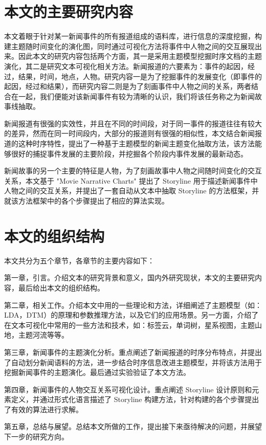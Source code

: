 \section{本文的主要研究内容}
本文着眼于针对某一新闻事件的所有报道组成的语料库，进行信息的深度挖掘，构建主题随时间变化的演化图，同时通过可视化方法将事件中人物之间的交互展现出来。因此本文的研究内容包括两个方面，其一是采用主题模型挖掘时序文档的主题演化，其二是研究文本可视化相关方法。新闻报道的六要素为：事件的起因，经过，结果，时间，地点，人物。研究内容一是为了挖掘事件的发展变化（即事件的起因，经过和结果），而研究内容二则是为了刻画事件中人物之间的关系，两者结合在一起，我们便能对该新闻事件有较为清晰的认识，我们将该任务称之为新闻故事线抽取。

新闻报道有很强的实效性，并且在不同的时间段，对于同一事件的报道往往有较大的差异，然而在同一时间段内，大部分的报道则有很强的相似性，本文结合新闻报道的这种时序特性，提出了一种基于主题模型的新闻主题变化抽取方法，该方法能够很好的捕捉事件发展的主要阶段，并挖掘各个阶段内事件发展的最新动态。

新闻故事的另一个主要的特征是人物，为了刻画故事中人物之间随时间变化的交互关系，本文基于 "Movie Narrative Charts" \cite{xkcd657} 提出了 Storyline 用于描述新闻事件中人物之间的交互关系，并提出了一套自动从文本中抽取 Storyline 的方法框架，并就该方法框架中的各个步骤提出了相应的算法实现。

\section{本文的组织结构}
本文共分为五个章节，各章节的主要内容如下：

第一章，引言。介绍文本的研究背景和意义，国内外研究现状，本文的主要研究内容，最后给出本文的组织结构。

第二章，相关工作。介绍本文中用的一些理论和方法，详细阐述了主题模型（如：LDA，DTM）的原理和参数推理方法，以及它们的应用场景。另一方面，介绍了在文本可视化中常用的一些方法和技术，如：标签云，单词树，星系视图，主题山地，主题河流等等。

第三章，新闻事件的主题演化分析。重点阐述了新闻报道的时序分布特点，并提出了自动划分新闻语料的方法，进一步结合时序信息改进主题模型，并将该方法用于挖掘新闻事件的主题演化。最后通过实验验证了本文方法。

第四章，新闻事件的人物交互关系可视化设计。重点阐述 Storyline 设计原则和元素定义，并通过形式化语言描述了 Storyline 构建方法，针对构建的各个步骤提出了有效的算法进行求解。

第五章，总结与展望。总结本文所做的工作，提出接下来亟待解决的问题，并展望下一步的研究方向。

